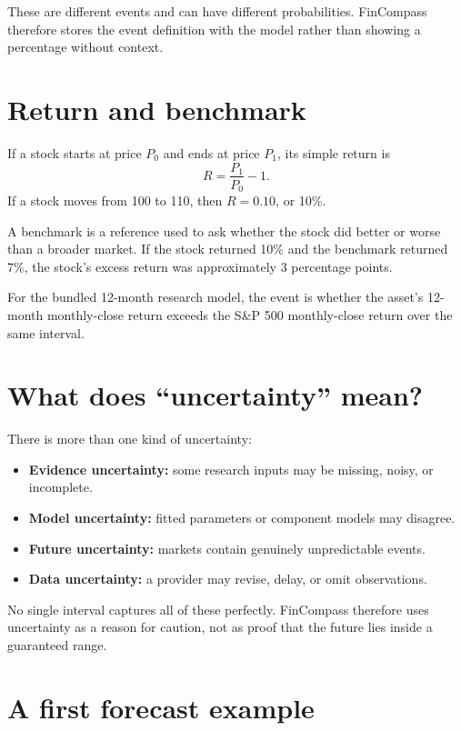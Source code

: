 \documentclass[11pt]{article}
\begin{document}
These are different events and can have different probabilities. FinCompass therefore stores the event definition with the model rather than showing a percentage without context.

\section{Return and benchmark}

If a stock starts at price $P_0$ and ends at price $P_1$, its simple return is
\begin{equation}
R=\frac{P_1}{P_0}-1.
\end{equation}
If a stock moves from 100 to 110, then $R=0.10$, or 10\%.

A benchmark is a reference used to ask whether the stock did better or worse than a broader market. If the stock returned 10\% and the benchmark returned 7\%, the stock's excess return was approximately 3 percentage points.

For the bundled 12-month research model, the event is whether the asset's 12-month monthly-close return exceeds the S\&P 500 monthly-close return over the same interval.

\section{What does ``uncertainty'' mean?}

There is more than one kind of uncertainty:

\begin{itemize}
\item \textbf{Evidence uncertainty:} some research inputs may be missing, noisy, or incomplete.
\item \textbf{Model uncertainty:} fitted parameters or component models may disagree.
\item \textbf{Future uncertainty:} markets contain genuinely unpredictable events.
\item \textbf{Data uncertainty:} a provider may revise, delay, or omit observations.
\end{itemize}

No single interval captures all of these perfectly. FinCompass therefore uses uncertainty as a reason for caution, not as proof that the future lies inside a guaranteed range.

\section{A first forecast example}
\end{document}
